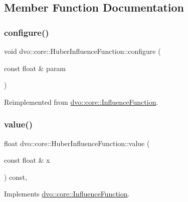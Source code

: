 \subsection{Member Function Documentation}
\mbox{\label{classdvo_1_1core_1_1_huber_influence_function_aab5a25ad6f632e829c8ad2ccf073fdec}} 
\subsubsection{\texorpdfstring{configure()}{configure()}}
{\footnotesize\ttfamily void dvo\+::core\+::\+Huber\+Influence\+Function\+::configure (\begin{DoxyParamCaption}\item[{const float \&}]{param }\end{DoxyParamCaption})\hspace{0.3cm}{\ttfamily [virtual]}}



Reimplemented from \mbox{\hyperlink{classdvo_1_1core_1_1_influence_function_a4773b03ca609bc5d8391d09d92ab34ad}{dvo\+::core\+::\+Influence\+Function}}.

\mbox{\label{classdvo_1_1core_1_1_huber_influence_function_af41e9e57eedcd25db690a1f41f3d6c8a}} 
\subsubsection{\texorpdfstring{value()}{value()}}
{\footnotesize\ttfamily float dvo\+::core\+::\+Huber\+Influence\+Function\+::value (\begin{DoxyParamCaption}\item[{const float \&}]{x }\end{DoxyParamCaption}) const\hspace{0.3cm}{\ttfamily [inline]}, {\ttfamily [virtual]}}



Implements \mbox{\hyperlink{classdvo_1_1core_1_1_influence_function_a158082c763fa9de460e75a285bb91f1e}{dvo\+::core\+::\+Influence\+Function}}.



